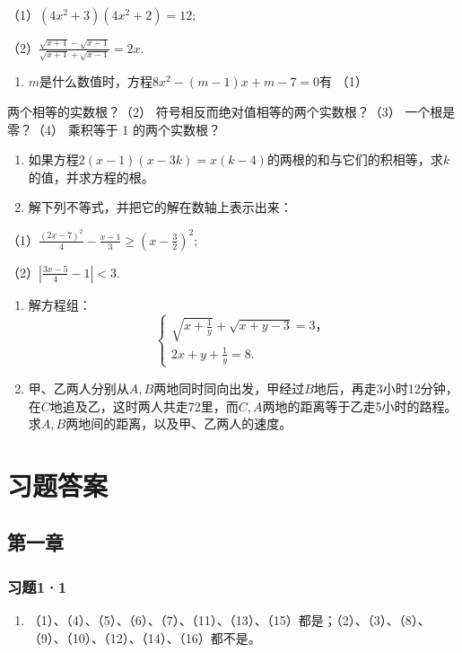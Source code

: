 （1）\((4x^{2} + 3)(4x^{2} + 2) = 12;\)

（2）\(\frac{\sqrt{x + 1} - \sqrt{x - 1}}{\sqrt{x + 1} + \sqrt{x - 1}} = 2x.\)

\begin{enumerate}[start=8]
\item
  \(m\)是什么数值时，方程\(8x^{2} - (m - 1)x + m - 7 = 0\)有 （1）
\end{enumerate}
两个相等的实数根？（2） 符号相反而绝对值相等的两个实数根？（3）
一个根是零？（4） 乘积等于 1 的两个实数根？

\begin{enumerate}[start=9]
\item
  如果方程\(2(x - 1)(x - 3k) = x(k - 4)\)的两根的和与它们的积相等，求\(k\)的值，并求方程的根。
\item
  解下列不等式，并把它的解在数轴上表示出来：
\end{enumerate}

（1）\(\frac{(2x - 7)^2}{4} - \frac{x - 1}{3} \geqslant \left(x - \frac{3}{2}\right)^2;\)

（2）\(\left|\frac{3x-5}{4}-1\right|<3.\)

\begin{enumerate}[start=11]
\item
  解方程组：
\[
\left\{ \begin{array}{l} \sqrt {x + \frac{1}{y}} + \sqrt {x + y - 3} = 3\text{，} \\ 2 x + y + \frac{1}{y} = 8. \end{array} \right.
\]
\item
  甲、乙两人分别从\(A, B\)两地同时同向出发，甲经过\(B\)地后，再走3小时12分钟，在\(C\)地追及乙，这时两人共走72里，而\(C, A\)两地的距离等于乙走5小时的路程。求\(A, B\)两地间的距离，以及甲、乙两人的速度。
\end{enumerate}

\chapter{习题答案}

\section{第一章}

\subsection{习题1·1}

\begin{enumerate}[start=3]
\item
  （1）、（4）、（5）、（6）、（7）、（11）、（13）、（15）都是；（2）、（3）、（8）、（9）、（10）、（12）、（14）、（16）都不是。
\end{enumerate}

